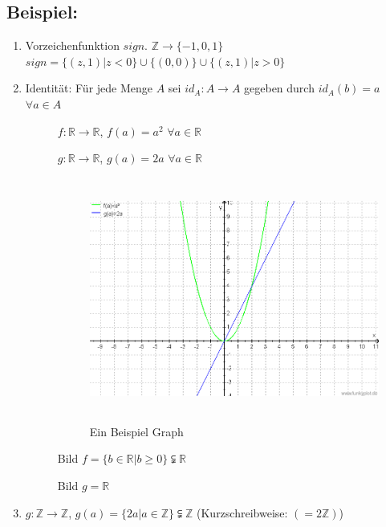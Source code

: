 \subsection{Beispiel:}
	\begin{enumerate} 

		\item Vorzeichenfunktion $sign.$ $\mathbb{Z} \rightarrow\{-1,0,1\}$ $sign= \{(z,1)|z < 0\} \cup \{(0,0)\} \cup \{(z,1)|z > 0\}$

		\item  Identität: Für jede Menge $A$ sei $id_{A}: A \rightarrow A$ gegeben durch $id_{A} (b)=a$ $ \forall a \in A$

		\begin{description}
			\item[ ]{\pgreen $f:\mathbb{R}\rightarrow \mathbb{R}$, $f(a) = a^{2}$ $\forall a \in \mathbb{R}$}
			\item[ ]{\pblue $g:\mathbb{R}\rightarrow \mathbb{R}$, $g(a)=2a$ $\forall a\in \mathbb{R}$}
				\begin{figure} [H]
				\centering 
				\includegraphics[width=14cm, height=8cm]{mainmatter/chapter1/pics/graph.png}
				\caption{Ein Beispiel Graph} 
				\end{figure}
			\item[ ] Bild $f=\{b \in \mathbb{R} | b \geq 0\} \subsetneqq \mathbb{R}$
			\item[ ] Bild $g = \mathbb{R}$
		\end{description}
		
		\item $g:\mathbb{Z}\rightarrow\mathbb{Z}$, $g(a)=\{2a|a\in\mathbb{Z}\} \subsetneqq \mathbb{Z}$ (Kurzschreibweise: $(=2\mathbb{Z})$)

	\end{enumerate} 
%
%
%
